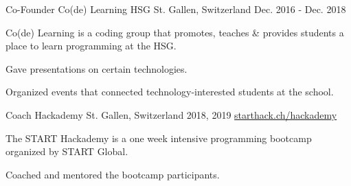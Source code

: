 

\begin{cventries}

  \cventry
    {Co-Founder} %
    {Co(de) Learning HSG} %
    {St. Gallen, Switzerland} %
    {Dec. 2016 - Dec. 2018} %
    {} %
    {
      \begin{cvitems} %
        \item {Co(de) Learning is a coding group that promotes, teaches \& provides students a place to learn programming at the HSG.}
        \item {Gave presentations on certain technologies.}
        \item {Organized events that connected technology-interested students at the school.}
      \end{cvitems}
    }

    \cventry
      {Coach} %
      {Hackademy} %
      {St. Gallen, Switzerland} %
      {2018, 2019} %
      {\href{https://starthack.ch/hackademy/}{starthack.ch/hackademy}} %
      {
        \begin{cvitems} %
          \item {The START Hackademy is a one week intensive programming bootcamp organized by START Global.}
          \item {Coached and mentored the bootcamp participants.}
        \end{cvitems}
      }



\end{cventries}
